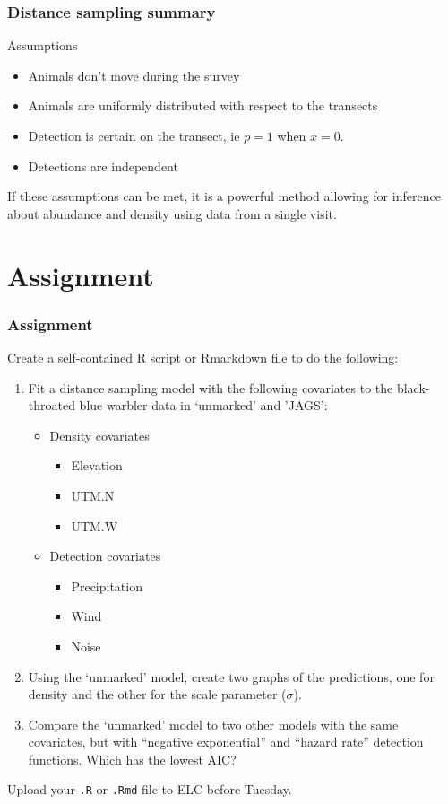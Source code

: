 \documentclass[color=usenames,dvipsnames]{beamer}\usepackage[]{graphicx}\usepackage[]{color}
\begin{document}
\begin{frame}
  \frametitle{Distance sampling summary}
  Assumptions
  \begin{itemize}
    \item Animals don't move during the survey
    \item Animals are uniformly distributed with respect to the
      transects
    \item Detection is certain on the transect, ie $p=1$ when $x=0$. 
    \item Detections are independent
  \end{itemize}
  \pause
  \vfill
  If these assumptions can be met, it is a powerful method allowing
  for inference about abundance and density using data from a single
  visit. \\
\end{frame}




\section{Assignment}




\begin{frame}[fragile]
  \frametitle{Assignment}
  \footnotesize
  Create a self-contained R script or Rmarkdown file
  to do the following:
  \vfill
  \begin{enumerate}
    \footnotesize
    \item Fit a distance sampling model with the following covariates
      to the black-throated blue warbler data in `unmarked' and 'JAGS': 
      \begin{itemize}
        \item Density covariates
          \begin{itemize}
            \item Elevation
            \item UTM.N
            \item UTM.W
          \end{itemize}
        \item Detection covariates
          \begin{itemize}
            \item Precipitation
            \item Wind
            \item Noise
          \end{itemize}
      \end{itemize}
    \item Using the `unmarked' model, create two graphs of the
      predictions, one for density and the other for the scale
      parameter ($\sigma$).
    \item Compare the `unmarked' model to two other models with the
      same covariates, but with ``negative exponential'' and ``hazard
      rate'' detection functions. Which has the lowest AIC? 
  \end{enumerate}
  \vfill
  Upload your {\tt .R} or {\tt .Rmd} file to ELC before Tuesday. 
\end{frame}
\end{document}
